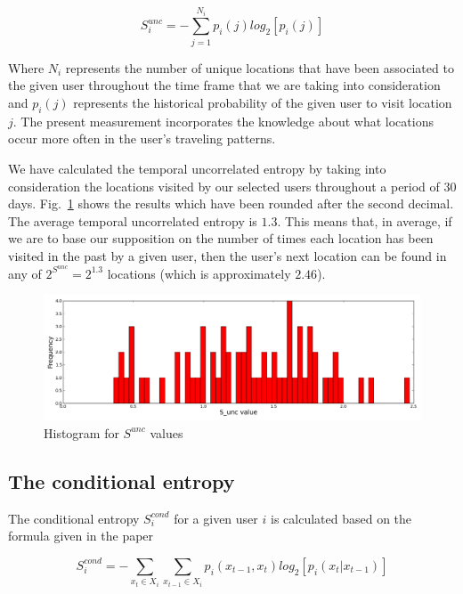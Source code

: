 \begin{equation}
S_{i}^{unc} = -\sum\limits_{j=1}^{N_{i}}p_{i}(j)log_{2}[p_{i}(j)]
\end{equation}

Where $N_{i}$ represents the number of unique locations that have been
associated to the given user throughout the time frame that we are taking into
consideration and $p_{i}(j)$ represents the historical probability of the given
user to visit location $j$. The present measurement incorporates the knowledge
about what locations occur more often in the user's traveling patterns.

We have calculated the temporal uncorrelated entropy by taking into
consideration the locations visited by our selected users throughout a period of
$30$ days. Fig.~\ref{dis_tu_e} shows the results which have been rounded after
the second decimal. The average temporal uncorrelated entropy is $1.3$.
This means that, in average, if we are to base our supposition on the number of
times each location has been visited in the past by a given user, then the
user's next location can be found in any of $2^{S^{unc}} = 2^{1.3}$ locations
(which is approximately $2.46$).

\begin{figure}[!h]
\centering
\includegraphics[width=\textwidth]{figures/entro_pred/tu_entro_distrib.png}
\caption{Histogram for $S^{unc}$ values}
\label{dis_tu_e}
\end{figure}

\subsection{The conditional entropy}
\label{con_e}
The conditional entropy $S_{i}^{cond}$ for a given user $i$ is calculated based
on the formula given in the paper \cite{Sinatra14}

\begin{equation}
S_{i}^{cond} = - \sum\limits_{x_{t}\in X_{i}} \sum\limits_{x_{t-1}\in X_{i}}
p_{i}(x_{t-1},x_{t})log_{2}[p_{i}(x_{t}|x_{t-1})]
\end{equation}

